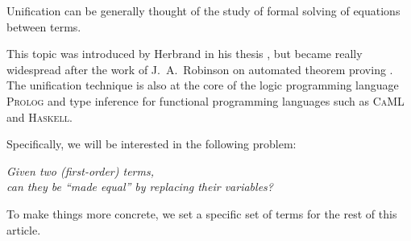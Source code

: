 Unification can be generally thought of the study of formal solving of equations between terms.

This topic was introduced by Herbrand in his thesis \cite{herbrand_recherches_1930}, but became really widespread after the work of J.~A.~Robinson on automated theorem proving \cite{robinson_machine-oriented_1965}. The unification technique is also at the core of the logic programming language \textsc{Prolog} and type inference for functional programming languages such as \textsc{CaML} and \textsc{Haskell}.


Specifically, we will be interested in the following problem: 
\begin{center}
	\it Given two (first-order) terms,\\ can they be “made equal” by replacing their variables?
\end{center}

To make things more concrete, we set a specific set of terms for the rest of this article.






